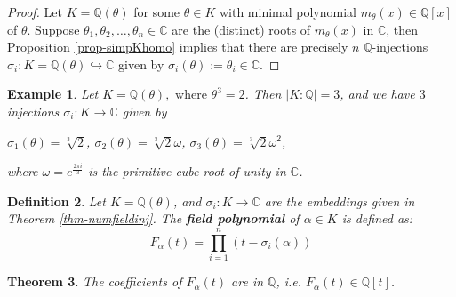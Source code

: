 \documentclass[11pt]{book}
\newtheorem{theorem}{Theorem}[section]
\newtheorem{definition}[theorem]{Definition}
\newtheorem{example}[theorem]{Example}
\begin{document}
\begin{proof} Let $K = \mathbb{Q}(\theta)$ for some $\theta \in K$ with minimal polynomial $m_{\theta}(x) \in \mathbb{Q}[x]$ of $\theta$. Suppose $\theta_1, \theta_2, \dots, \theta_n \in \mathbb{C}$ are the (distinct) roots of $m_{\theta}(x)$ in $\mathbb{C}$, then Proposition \ref{prop-simpKhomo} implies that there are precisely $n$ $\mathbb{Q}$-injections $\sigma_i: K= \mathbb{Q}(\theta) \hookrightarrow \mathbb{C}$
given by
\(\sigma_i(\theta) := \theta_i \in \mathbb{C}\).
\end{proof}

\begin{example}
Let $K = \mathbb{Q}(\theta), \text{ where } \theta^3 = 2$. Then $|K : \mathbb{Q}| = 3$, and we have $3$ injections $\sigma_i: K \to \mathbb{C}$ given by 
\begin{center}
$\sigma_1(\theta) = \sqrt[3]{2}$, \quad $\sigma_2(\theta) = \sqrt[3]{2}\omega$, \quad $\sigma_3(\theta) = \sqrt[3]{2}\omega^2$,    
\end{center}
 where $\omega = e^{\frac{2\pi i}{3}}$ is the primitive cube root of unity in $\mathbb{C}$.
\end{example}


\begin{definition} \label{def-fieldpoly} Let $K = \mathbb{Q}(\theta)$, and $\sigma_i: K \to \mathbb{C}$ are the embeddings given in Theorem \ref{thm-numfieldinj}. The {\bf field polynomial} of $\alpha \in K$ is
defined as:
\[
F_{\alpha}(t) = \prod_{i=1}^n (t - \sigma_i(\alpha))
\]
\end{definition}

\begin{theorem} \label{thm-fieldpoly} The coefficients of $F_{\alpha}(t)$ are in $\mathbb{Q}$, i.e. $F_{\alpha}(t) \in \mathbb{Q}[t]$.
\end{theorem}
\end{document}
